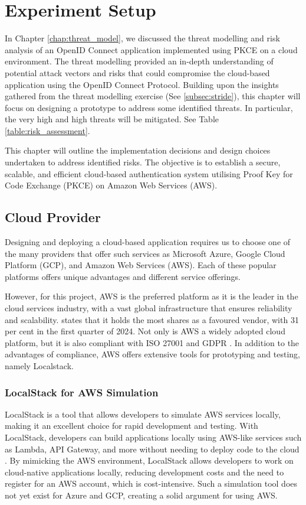 \chapter{Experiment Setup}
\label{chap:design}
In Chapter \ref{chap:threat_model}, we discussed the threat modelling and risk analysis of an OpenID Connect application implemented using PKCE on a cloud environment. The threat modelling provided an in-depth understanding of potential attack vectors and risks that could compromise the cloud-based application using the OpenID Connect Protocol. Building upon the insights gathered from the threat modelling exercise (See \ref{subsec:stride}), this chapter will focus on designing a prototype to address some identified threats. In particular, the very high and high threats will be mitigated. See Table \ref{table:risk_assessment}. 

This chapter will outline the implementation decisions and design choices undertaken to address identified risks. The objective is to establish a secure, scalable, and efficient cloud-based authentication system utilising Proof Key for Code Exchange (PKCE) on Amazon Web Services (AWS).

\section{Cloud Provider}
\label{sec:cloud_provider}
Designing and deploying a cloud-based application requires us to choose one of the many providers that offer such services as Microsoft Azure, Google Cloud Platform (GCP), and Amazon Web Services (AWS). Each of these popular platforms offers unique advantages and different service offerings. 

However, for this project, AWS is the preferred platform as it is the leader in the cloud services industry, with a vast global infrastructure that ensures reliability and scalability. \cite{aws_leader} states that it holds the most shares as a favoured vendor, with 31 per cent in the first quarter of 2024. Not only is AWS a widely adopted cloud platform, but it is also compliant with ISO 27001 and GDPR \citep{aws_iso}. In addition to the advantages of compliance, AWS offers extensive tools for prototyping and testing, namely Localstack.

\subsection{LocalStack for AWS Simulation}
LocalStack is a tool that allows developers to simulate AWS services locally, making it an excellent choice for rapid development and testing. With LocalStack, developers can build applications locally using AWS-like services such as Lambda, API Gateway, and more without needing to deploy code to the cloud \citep{localstack}. By mimicking the AWS environment, LocalStack allows developers to work on cloud-native applications locally, reducing development costs and the need to register for an AWS account, which is cost-intensive. Such a simulation tool does not yet exist for Azure and GCP, creating a solid argument for using AWS.


